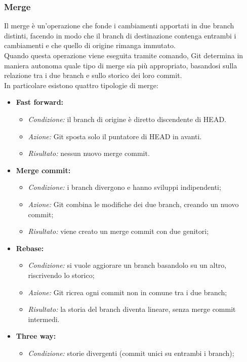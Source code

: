 \documentclass[12pt]{article}
\begin{document}
\subsubsection{Merge}
Il merge è un'operazione che fonde i cambiamenti apportati in due branch distinti, facendo in modo che il branch di destinazione contenga entrambi i cambiamenti e che quello di origine rimanga immutato.\\
Quando questa operazione viene eseguita tramite comando, Git determina in maniera autonoma quale tipo di merge sia più appropriato, basandosi sulla relazione tra i due branch e sullo storico dei loro commit.\\
In particolare esistono quattro tipologie di merge:
\begin{itemize}
\item \textbf{Fast forward:}
\begin{itemize}
\item \textit{Condizione:} il branch di origine è diretto discendente di HEAD.
\item \textit{Azione:} Git sposta solo il puntatore di HEAD in avanti. 
\item \textit{Risultato:} nessun nuovo merge commit. 
\end{itemize}
\item \textbf{Merge commit:}
\begin{itemize}
\item \textit{Condizione:} i branch divergono e hanno sviluppi indipendenti;
\item \textit{Azione:} Git combina le modifiche dei due branch, creando un nuovo commit;
\item \textit{Risultato:} viene creato un merge commit con due genitori;
\end{itemize}
\item \textbf{Rebase:}
\begin{itemize}
\item \textit{Condizione:} si vuole aggiorare un branch basandolo su un altro, riscrivendo lo storico;
\item \textit{Azione:} Git ricrea ogni commit non in comune tra i due branch; 
\item \textit{Risultato:} la storia del branch diventa lineare, senza merge commit intermedi. 
\end{itemize}
\item \textbf{Three way:}
\begin{itemize}
\item \textit{Condizione:} storie divergenti (commit unici su entrambi i branch);

\end{itemize}
\end{itemize}
\end{document}
